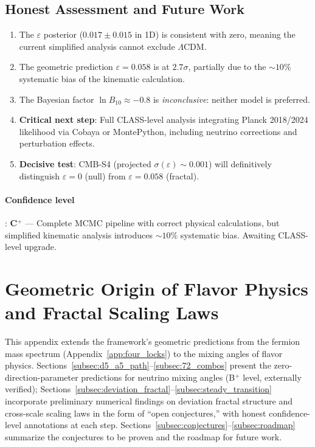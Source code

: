 \documentclass[12pt,a4paper,twocolumn]{article}
\begin{document}
\subsection{Honest Assessment and Future Work}
\begin{enumerate}
\item The $\varepsilon$ posterior ($0.017 \pm 0.015$ in 1D) is consistent with zero, meaning the current simplified analysis cannot exclude $\Lambda$CDM.
\item The geometric prediction $\varepsilon = 0.058$ is at $2.7\sigma$, partially due to the $\sim 10\%$ systematic bias of the kinematic calculation.
\item The Bayesian factor $\ln B_{10} \approx -0.8$ is \emph{inconclusive}: neither model is preferred.
\item \textbf{Critical next step}: Full CLASS-level analysis integrating Planck 2018/2024 likelihood via Cobaya or MontePython, including neutrino corrections and perturbation effects.
\item \textbf{Decisive test}: CMB-S4 (projected $\sigma(\varepsilon) \sim 0.001$) will definitively distinguish $\varepsilon = 0$ (null) from $\varepsilon = 0.058$ (fractal).
\end{enumerate}

\paragraph{Confidence level}: \textbf{C$^+$} --- Complete MCMC pipeline with correct physical calculations, but simplified kinematic analysis introduces $\sim 10\%$ systematic bias. Awaiting CLASS-level upgrade.



\section{Geometric Origin of Flavor Physics and Fractal Scaling Laws}
\label{app:flavor_geometry}

This appendix extends the framework's geometric predictions from the fermion mass spectrum (Appendix~\ref{app:four_locks}) to the mixing angles of flavor physics. Sections~\ref{subsec:d5_a5_path}--\ref{subsec:72_combos} present the zero-direction-parameter predictions for neutrino mixing angles (B$^+$ level, externally verified); Sections~\ref{subsec:deviation_fractal}--\ref{subsec:steady_transition} incorporate preliminary numerical findings on deviation fractal structure and cross-scale scaling laws in the form of ``open conjectures,'' with honest confidence-level annotations at each step. Sections~\ref{subsec:conjectures}--\ref{subsec:roadmap} summarize the conjectures to be proven and the roadmap for future work.
\end{document}
